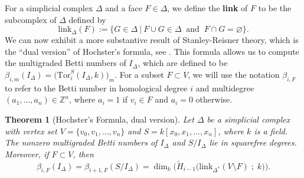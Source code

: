 \documentclass[12pt,leqno]{amsart}
\newtheorem{theorem}[lemma]{Theorem}
\theoremstyle{definition}
\begin{document}
%
For a simplicial complex $\Delta$ and a face $F \in \Delta$, we define the \textbf{link} of $F$ to be the subcomplex of $\Delta$ defined by
%
\begin{displaymath}
  \mathrm{link}_\Delta(F) := \{ G \in \Delta \ | \ F \cup G \in \Delta \ \text{ and } \ F \cap G = \varnothing \}.
\end{displaymath}
%
We can now exhibit a more substantive result of Stanley-Reisner theory, which is the ``dual version'' of Hochster's formula, see \cite[Corollary 1.40]{MS}. This formula allows us to compute the multigraded Betti numbers of $I_\Delta$, which are defined to be $\beta_{i,m}(I_\Delta) = \big( \mathrm{Tor}_i^S(I_\Delta, k) \big)_m$. For a subset $F \subset V$, we will use the notation $\beta_{i,F}$ to refer to the Betti number in homological degree $i$ and multidegree $(a_1,...,a_n) \in \mathbb Z^n$, where $a_i = 1$ if $v_i \in F$ and $a_i = 0$ otherwise.
%
\begin{theorem}[Hochster's Formula, dual version]
  Let $\Delta$ be a simplicial complex with vertex set $V = \{v_0,v_1,...,v_n\}$ and $S = k[x_0,x_1,...,x_n]$, where $k$ is a field. The nonzero multigraded Betti numbers of $I_\Delta$ and $S/I_\Delta$ lie in squarefree degrees. Moreover, if $F \subset V$, then
  \begin{displaymath}
    \beta_{i,F} (I_\Delta) = \beta_{i+1,F} (S/I_\Delta) = \dim_k\Big(\widetilde H_{i-1} \big( \mathrm{link}_{\Delta^*}(V \setminus F)\; ; \; k \big) \Big).
  \end{displaymath}
\end{theorem}
%
\end{document}
